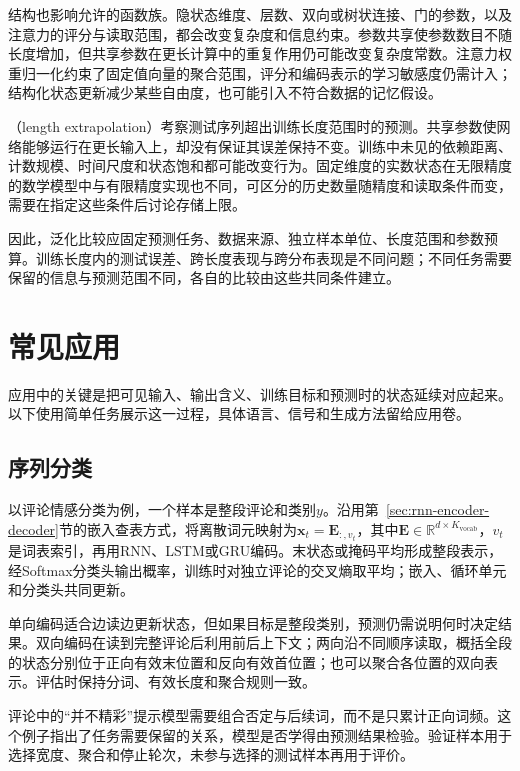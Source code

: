 结构也影响允许的函数族。隐状态维度、层数、双向或树状连接、门的参数，以及注意力的评分与读取范围，都会改变复杂度和信息约束。参数共享使参数数目不随长度增加，但共享参数在更长计算中的重复作用仍可能改变复杂度常数。注意力权重归一化约束了固定值向量的聚合范围，评分和编码表示的学习敏感度仍需计入；结构化状态更新减少某些自由度，也可能引入不符合数据的记忆假设。

（length extrapolation）考察测试序列超出训练长度范围时的预测。共享参数使网络能够运行在更长输入上，却没有保证其误差保持不变。训练中未见的依赖距离、计数规模、时间尺度和状态饱和都可能改变行为。固定维度的实数状态在无限精度的数学模型中与有限精度实现也不同，可区分的历史数量随精度和读取条件而变，需要在指定这些条件后讨论存储上限。

因此，泛化比较应固定预测任务、数据来源、独立样本单位、长度范围和参数预算。训练长度内的测试误差、跨长度表现与跨分布表现是不同问题；不同任务需要保留的信息与预测范围不同，各自的比较由这些共同条件建立。

\section{常见应用}
\label{sec:rnn-applications}

应用中的关键是把可见输入、输出含义、训练目标和预测时的状态延续对应起来。以下使用简单任务展示这一过程，具体语言、信号和生成方法留给应用卷。

\subsection{序列分类}
\label{sec:rnn-application-classification}

以评论情感分类为例，一个样本是整段评论和类别$y$。沿用第~\ref{sec:rnn-encoder-decoder}节的嵌入查表方式，将离散词元映射为$\bm{x}_t=\bm{E}_{:,v_t}$，其中$\bm{E}\in\mathbb{R}^{d\times K_{\mathrm{vocab}}}$，$v_t$是词表索引，再用RNN、LSTM或GRU编码。末状态或掩码平均形成整段表示，经Softmax分类头输出概率，训练时对独立评论的交叉熵取平均；嵌入、循环单元和分类头共同更新。

单向编码适合边读边更新状态，但如果目标是整段类别，预测仍需说明何时决定结果。双向编码在读到完整评论后利用前后上下文；两向沿不同顺序读取，概括全段的状态分别位于正向有效末位置和反向有效首位置；也可以聚合各位置的双向表示。评估时保持分词、有效长度和聚合规则一致。

评论中的“并不精彩”提示模型需要组合否定与后续词，而不是只累计正向词频。这个例子指出了任务需要保留的关系，模型是否学得由预测结果检验。验证样本用于选择宽度、聚合和停止轮次，未参与选择的测试样本再用于评价。

